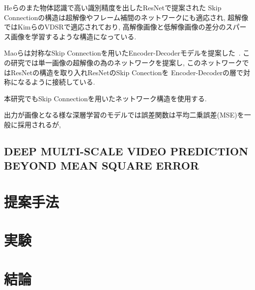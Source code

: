 \documentclass[twocolumn,a4j,uplatex]{jsarticle}
\begin{document}
Heらのまた物体認識で高い識別精度を出したResNet\cite{He_2016_CVPR}で提案された
Skip Connectionの構造は超解像やフレーム補間のネットワークにも適応され,
超解像ではKimらのVDSR\cite{Kim_2016_CVPR}で適応されており,
高解像画像と低解像画像の差分のスパース画像を学習するような構造になっている.

Maoらは対称なSkip Connectionを用いたEncoder-Decoderモデルを提案した~\cite{DBLP:conf/nips/2016}.
この研究では単一画像の超解像の為のネットワークを提案し,
このネットワークではResNet\cite{He_2016_CVPR}の構造を取り入れResNetのSkip Conectionを
Encoder-Decoderの層で対称になるように接続している.

本研究でもSkip Connectionを用いたネットワーク構造を使用する.

出力が画像となる様な深層学習のモデルでは誤差関数は平均二乗誤差(MSE)を一般に採用されるが,
\subsection*{DEEP MULTI-SCALE VIDEO PREDICTION BEYOND MEAN SQUARE ERROR}
\section{提案手法}
\section{実験}
\section{結論}



\end{document}
